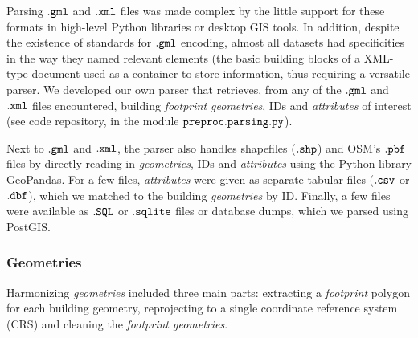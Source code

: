 \documentclass[fleqn,10pt]{wlscirep}
\begin{document}
Parsing $\tt{.gml}$ and $\tt{.xml}$ files was made complex by the little support for these formats in high-level Python libraries or desktop GIS tools. In addition, despite the existence of standards for $\tt{.gml}$ encoding, almost all datasets had specificities in the way they named relevant elements (the basic building blocks of a XML-type document used as a container to store information, thus requiring a versatile parser. We developed our own parser that retrieves, from any of the $\tt{.gml}$ and $\tt{.xml}$ files encountered, building \textit{footprint geometries}, IDs and \textit{attributes} of interest (see code repository\cite{eubucco-0.1-code2022}, in the module $\tt{preproc.parsing.py}$). 

Next to $\tt{.gml}$ and $\tt{.xml}$, the parser also handles shapefiles ($\tt{.shp}$) and OSM's $\tt{.pbf}$ files by directly reading in \textit{geometries}, IDs and \textit{attributes} using the Python library GeoPandas\cite{kelsey_jordahl_2020_3946761}. For a few files, \textit{attributes} were given as separate tabular files ($\tt{.csv}$ or $\tt{.dbf}$), which we matched to the building \textit{geometries} by ID. Finally, a few files were available as $\tt{.SQL}$ or $\tt{.sqlite}$ files or database dumps, which we parsed using PostGIS.


\subsubsection*{Geometries} Harmonizing \textit{geometries} included three main parts: extracting a \textit{footprint} polygon for each building geometry, reprojecting to a single coordinate reference system (CRS) and cleaning the \textit{footprint geometries}.
\end{document}
